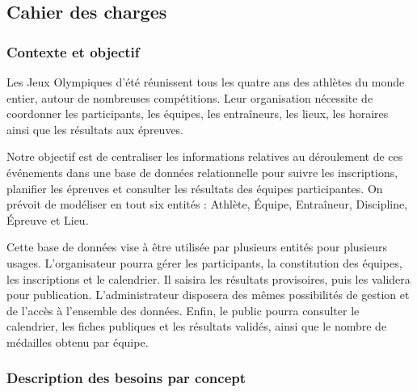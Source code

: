 \subsection{Cahier des charges}

\subsubsection{Contexte et objectif}

Les Jeux Olympiques d'été réunissent tous les quatre ans des athlètes du monde entier, autour de nombreuses compétitions. Leur organisation nécessite de coordonner les participants, les équipes, les entraîneurs, les lieux, les horaires ainsi que les résultats aux épreuves.

Notre objectif est de centraliser les informations relatives au déroulement de ces événements dans une base de données relationnelle pour suivre les inscriptions, planifier les épreuves et consulter les résultats des équipes participantes. On prévoit de modéliser en tout six entités : Athlète, Équipe, Entraîneur, Discipline, Épreuve et Lieu.

Cette base de données vise à être utilisée par plusieurs entités pour plusieurs usages. L'organisateur pourra gérer les participants, la constitution des équipes, les inscriptions et le calendrier. Il saisira les résultats provisoires, puis les validera pour publication. L'administrateur disposera des mêmes possibilités de gestion et de l'accès à l'ensemble des données. Enfin, le public pourra consulter le calendrier, les fiches publiques et les résultats validés, ainsi que le nombre de médailles obtenu par équipe.

\subsubsection{Description des besoins par concept}

